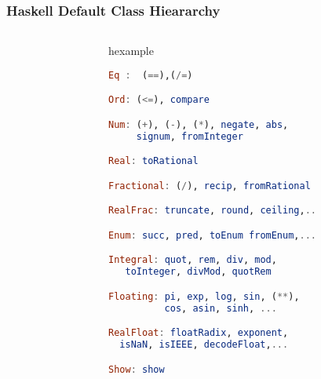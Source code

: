 \begin{frame}[fragile]
\frametitle{Haskell Default Class Hieararchy}
\scriptsize
\begin{columns}
\begin{column}{.56\textwidth}
\end{column}
\begin{column}{.44\textwidth}
\begin{beamercolorbox}{hexample}
\begin{lstlisting}[language=Haskell,basicstyle=\tiny\tt]
Eq :  (==),(/=)

Ord: (<=), compare

Num: (+), (-), (*), negate, abs, 
     signum, fromInteger

Real: toRational

Fractional: (/), recip, fromRational

RealFrac: truncate, round, ceiling,..

Enum: succ, pred, toEnum fromEnum,...

Integral: quot, rem, div, mod,
   toInteger, divMod, quotRem

Floating: pi, exp, log, sin, (**),
          cos, asin, sinh, ...

RealFloat: floatRadix, exponent, 
  isNaN, isIEEE, decodeFloat,...

Show: show
\end{lstlisting}
\end{beamercolorbox}
\end{column}
\end{columns}
\end{frame}


